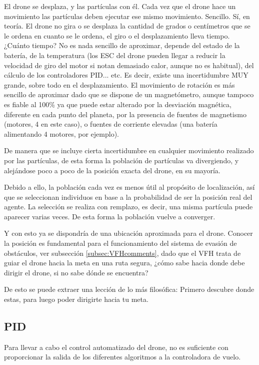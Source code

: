 El drone se desplaza, y las partículas con él. Cada vez que el drone hace un movimiento las partículas deben ejecutar ese mismo movimiento. Sencillo. Sí, en teoría. El drone no gira o se desplaza la cantidad de grados o centímetros que se le ordena en cuanto se le ordena, el giro o el desplazamiento lleva tiempo. ¿Cuánto tiempo? No es nada sencillo de aproximar, depende del estado de la batería, de la temperatura (los ESC del drone pueden llegar a reducir la velocidad de giro del motor si notan demasiado calor, aunque no es habitual), del cálculo de los controladores PID... etc. 
Es decir, existe una incertidumbre MUY grande, sobre todo en el desplazamiento. El movimiento de rotación es más sencillo de aproximar dado que se dispone de un magnetómetro, aunque tampoco es fiable al 100\% ya que puede estar alterado por la desviación magnética, diferente en cada punto del planeta, por la presencia de fuentes de magnetismo (motores, 4 en este caso), o fuentes de corriente elevadas (una batería alimentando 4 motores, por ejemplo).

De manera que se incluye cierta incertidumbre en cualquier movimiento realizado por las partículas, de esta forma la población de partículas va divergiendo, y alejándose poco a poco de la posición exacta del drone, en su mayoría. 

Debido a ello, la población cada vez es menos útil al propósito de localización, así que se seleccionan individuos en base a la probabilidad de ser la posición real del agente. 
La selección se realiza con remplazo, es decir, una misma partícula puede aparecer varias veces. De esta forma la población vuelve a converger. 

Y con esto ya se dispondría de una ubicación aproximada para el drone. Conocer la posición es fundamental para el funcionamiento del sistema de evasión de obstáculos, ver subsección \ref{subsec:VFHcomments}, dado que el VFH trata de guiar el drone hacia la meta en una ruta segura, ¿cómo sabe hacia donde debe dirigir el drone, si no sabe dónde se encuentra?

De esto se puede extraer una lección de lo más filosófica: Primero descubre donde estas, para luego poder dirigirte hacia tu meta.


\subsection{PID}
\label{subsec:PIDcomments}
Para llevar a cabo el control automatizado del drone, no es suficiente con proporcionar la salida de los diferentes algoritmos a la controladora de vuelo. 

